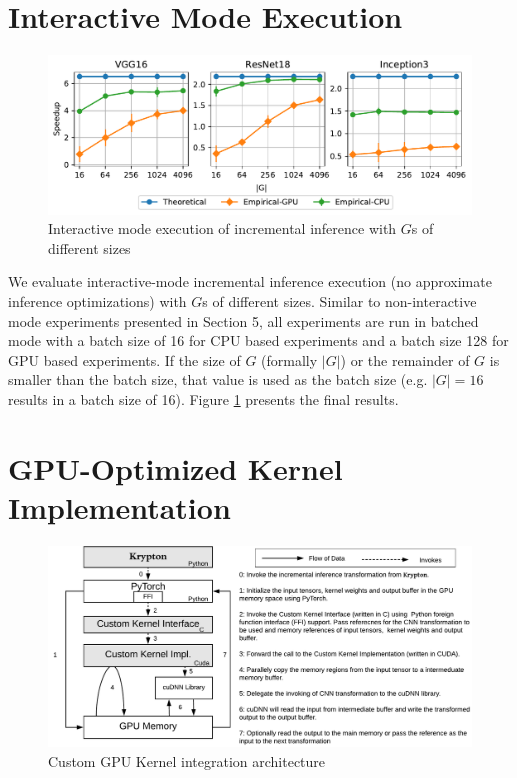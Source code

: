 \appendix

\section{Interactive Mode Execution}

\begin{figure}[t]
\includegraphics[width=\columnwidth]{images/interactive_experiment.pdf}
\vspace{-8mm}
\caption{Interactive mode execution of incremental inference with $G$s of different sizes}
\label{fig:interactive_experiment}
\end{figure}

We evaluate interactive-mode incremental inference execution (no approximate inference optimizations) with $G$s of different sizes.
Similar to non-interactive mode experiments presented in Section 5, all experiments are run in batched mode with a batch size of 16 for CPU based experiments and a batch size 128 for GPU based experiments.
If the size of $G$ (formally $|G|$) or the remainder of $G$ is smaller than the batch size, that value is used as the batch size (e.g. $|G| = 16$ results in a batch size of 16).
Figure \ref{fig:interactive_experiment} presents the final results.

\section{GPU-Optimized Kernel Implementation}

\begin{figure}[t]
\includegraphics[width=\columnwidth]{images/gpu_kernel_impl.pdf}
\vspace{-8mm}
\caption{Custom GPU Kernel integration architecture}
\label{fig:custom_kernel_integration}
\end{figure}

